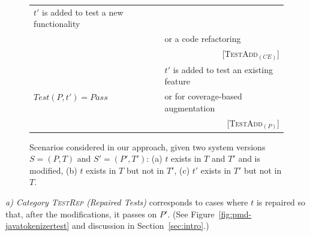 \documentclass[conference]{IEEEtran}
\newcommand{\lang}[1]{\texttt{\small #1}}
\newcommand{\subject}[1]{\texttt{\small #1}}
\newcommand{\mt}{\mathit}
\newcommand{\pass}{\mt{Pass}}
\newcommand{\testfunc}[2]{\mt{Test(#1, #2)}}
\newcommand{\catrep}{\textsc{TestRep}}
\newcommand{\cataddce}{\textsc{TestAdd}$_\mt{(CE)}$}
\newcommand{\cataddp}{\textsc{TestAdd}$_\mt{(P)}$}
\begin{document}
\begin{figure}[t]
\begin{tabular}{|l||l|}
  $t'$ is added to test a new functionality \\
  & or a code refactoring \\
  & \multicolumn{1}{r|}{\scriptsize [\cataddce{}]} \\
  \hline
  \multirow{3}{*}{$\testfunc{P}{t'} = \pass$} &
  $t'$ is added to test an existing feature\\
  & or for coverage-based augmentation \\
  & \multicolumn{1}{r|}{\scriptsize [\cataddp{}]} \\
  \hline
\end{tabular}
\caption{Scenarios considered in our approach, given two system
  versions $S = (P, T)$ and $S' = (P', T')$: (a) $t$ exists in $T$ and
  $T'$ and is modified, (b) $t$ exists in $T$ but not in $T'$, (c)
  $t'$ exists in $T'$ but not in $T$.}
\vspace*{-12pt}
\label{fig:study-design}
\end{figure}

\textit{a) Category \catrep{} (Repaired Tests)} corresponds to cases
where $t$ is repaired so that, after the modifications, it passes on
$P'.$ (See Figure~\ref{fig:pmd-javatokenizertest} and discussion in
Section~\ref{sec:intro}.)



\end{document}
